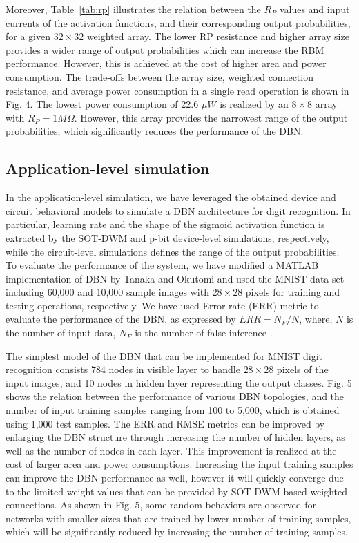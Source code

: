 Moreover, Table~\ref{tab:rp} illustrates the relation between the $R_P$ values and input currents of the activation functions, and their corresponding output probabilities, for a given $32 \times 32$ weighted array. The lower RP resistance and higher array size provides a wider range of output probabilities which can increase the RBM performance. However, this is achieved at the cost of higher area and power consumption. The trade-offs between the array size, weighted connection resistance, and average power consumption in a single read operation is shown in Fig. 4. The lowest power consumption of 22.6 $\mu W$ is realized by an $8 \times 8$ array with $R_P = 1 M \Omega$. However, this array provides the narrowest range of the output probabilities, which significantly reduces the performance of the DBN.




\subsection{Application-level simulation}
In the application-level simulation, we have leveraged the obtained device and circuit behavioral models to simulate a DBN architecture for digit recognition. In particular, learning rate and the shape of the sigmoid activation function is extracted by the SOT-DWM and p-bit device-level simulations, respectively, while the circuit-level simulations defines the range of the output probabilities.  To evaluate the performance of the system, we have modified a MATLAB implementation of DBN by Tanaka and Okutomi \cite{Tanaka2014} and used the MNIST data set \cite{Lecun1998} including 60,000 and 10,000 sample images with $28 \times 28$ pixels for training and testing operations, respectively. We have used Error rate (ERR) metric to evaluate the performance of the DBN, as expressed by $ERR=N_F/N$, where, $N$ is the number of input data, $N_F$ is the number of false inference \cite{Tanaka2014}. 




The simplest model of the DBN that can be implemented for MNIST digit recognition consists 784 nodes in visible layer to handle $28 \times 28$ pixels of the input images, and 10 nodes in hidden layer representing the output classes. Fig. 5 shows the relation between the performance of various DBN topologies, and the number of input training samples ranging from 100 to 5,000, which is obtained using 1,000 test samples. The ERR and RMSE metrics can be improved by enlarging the DBN structure through increasing the number of hidden layers, as well as the number of nodes in each layer. This improvement is realized at the cost of larger area and power consumptions. Increasing the input training samples can improve the DBN performance as well, however it will quickly converge due to the limited weight values that can be provided by SOT-DWM based weighted connections. As shown in Fig. 5, some random behaviors are observed for networks with smaller sizes that are trained by lower number of training samples, which will be significantly reduced by increasing the number of training samples.

